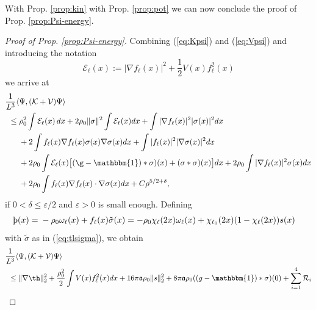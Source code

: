 \documentclass[a4paper,11pt]{article}
\def\cV{\mathcal{V}}
\def\cE{\mathcal{E}}
\def\cK{\mathcal{K}}
\def\eps{\varepsilon}
\def\ph{\varphi}
\def \dx{{d}x}
\numberwithin{equation}{section}
\let\s=\sigma \let\t=\tau     \let\f=\phi    \let\ph=\varphi   \let\c=\chi
\def\aa{\mathfrak{a}}
\begin{document}
With Prop. \ref{prop:kin} with Prop. \ref{prop:pot} we can now conclude the proof of Prop. \ref{prop:Psi-energy}. 
\begin{proof}[Proof of Prop. \ref{prop:Psi-energy}] Combining (\ref{eq:Kpsi}) and (\ref{eq:Vpsi}) and introducing the notation \begin{equation}
\cE_\ell(x) :=   |\nabla f_\ell(x)|^2 +  \frac 1 2 V(x)f^2_\ell(x)
\end{equation} 
we arrive at 
\begin{equation}\begin{split}
\frac{1}{L^3} \langle &\Psi, (\cK + \cV) \Psi \rangle \\ \leq\; & \rho_0^2 \int \cE_\ell(x)\, dx  
+ 2\rho_0 \|\s\|^2  \int  \cE_\ell(x) dx  
+ \int |\nabla f_\ell (x)|^2 |\sigma (x)|^2 dx \\ &+ 2\int f_\ell (x) \nabla f_\ell (x) \sigma (x) \nabla \sigma (x) dx  +  \int |f_\ell(x)|^2 |\nabla \s(x)|^2 dx \\
& + 2\rho_0 \int \cE_\ell(x) \big[(\g-\mathbbm{1}) \ast \s)(x) + (\s \ast \s)(x)\big] dx + 2\rho_0 \int |\nabla f_\ell(x)|^2 \sigma(x) dx \\
& + 2\rho_0 \int  f_\ell(x) \nabla f_\ell(x) \cdot \nabla \s (x)  dx + C \rho^{5/2+ \delta} ,
\end{split}
	\end{equation}
if $0 < \delta \leq \eps /2$ and $\eps > 0$ is small enough. Defining 
\begin{equation}\label{def:nu}
\begin{split} 
\th (x) = &\; - \rho_0 \omega_\ell (x) + f_\ell (x) \tilde{\sigma} (x) = - \rho_0 \chi_\ell (2x)  \omega_\ell (x) + \chi_{\ell_0} (2x) (1 - \chi_\ell (2x)) s (x) 
\end{split} 
\end{equation} 
with $\tilde{\sigma}$ as in (\ref{eq:tlsigma}), we obtain 
\begin{equation}\label{eq:Hpsi} \begin{split} 
\frac{1}{L^3} \langle &\Psi, (\cK + \cV) \Psi \rangle \\ \leq\; &\| \nabla \th\|_2^2 +\frac{\rho_0^2}{2} \int V(x)f^2_\ell(x) dx  + 16 \pi \aa \rho_0 \| s\|_2^2 + 8 \pi \aa \rho_0   ((g-\mathbbm{1}) \ast \sigma)(0) + \sum_{i=1}^4 \mathcal{R}_i 

\end{split}
\end{equation}
\end{proof}
\end{document}
